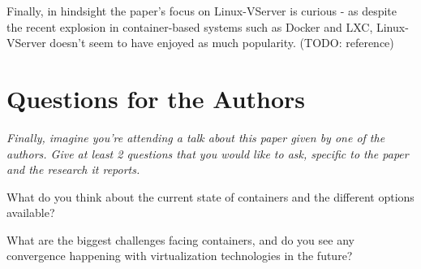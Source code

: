 \documentclass[11pt]{article}
\begin{document}
Finally, in hindsight the paper's focus on Linux-VServer is curious - as
despite the recent explosion in container-based systems such as Docker and LXC,
Linux-VServer doesn't seem to have enjoyed as much popularity. (TODO:
reference)






\section*{Questions for the Authors}

\textsl{Finally, imagine you're attending a talk about this paper given by one
of the authors. Give at least 2 questions that you would like to ask, specific
to the paper and the research it reports.}

What do you think about the current state of containers and the different
options available?

What are the biggest challenges facing containers, and do you see any
convergence happening with virtualization technologies in the future?




\end{document}
